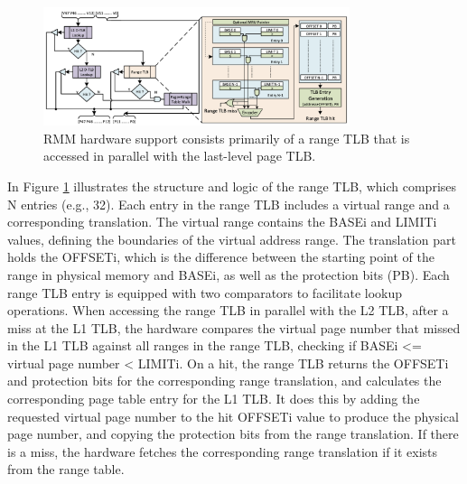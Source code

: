 \begin{figure}[h]
  \includegraphics[width=0.8\textwidth]{rmm.png}
  \caption{RMM\cite{karakostas_redundant_2015} hardware support consists primarily of a range TLB that is accessed in parallel with the last-level page TLB.}
  \label{fig:RMM}
\end{figure}

In Figure \ref{fig:RMM} illustrates the structure and logic of the range TLB, which comprises N entries (e.g., 32). Each entry in 
the range TLB includes a virtual range and a corresponding translation. The virtual range contains the BASEi and LIMITi values, defining 
the boundaries of the virtual address range. The translation part holds the OFFSETi, which is the difference between the starting point 
of the range in physical memory and BASEi, as well as the protection bits (PB). Each range TLB entry is equipped with two comparators to facilitate lookup operations. 
When accessing the range TLB in parallel with the L2 TLB, after a miss at the L1 TLB, the hardware compares the virtual page number that missed in the L1 TLB against 
all ranges in the range TLB, checking if BASEi <= virtual page number < LIMITi. On a hit, the range TLB returns the OFFSETi and protection bits for the corresponding 
range translation, and calculates the corresponding page table entry for the L1 TLB. It does this by adding the requested virtual page number to the hit 
OFFSETi value to produce the physical page number, and copying the protection bits from the range translation. If there is a miss, the hardware fetches 
the corresponding range translation if it exists from the range table.



